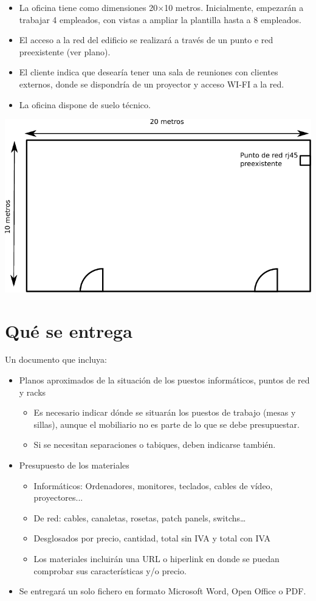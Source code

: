 \begin{itemize}
\item La oficina tiene como dimensiones 20$\times$10  metros. Inicialmente, empezarán a trabajar 4 empleados, con vistas a  ampliar la plantilla hasta a 8 empleados.
\item El acceso a la red del edificio se realizará a través de un punto e red preexistente (ver plano).
\item El cliente indica que desearía tener una sala de reuniones con clientes externos, donde se dispondría de un proyector y acceso WI-FI a la red.
\item La oficina dispone de suelo técnico.
\end{itemize}
\begin{center}
  \includegraphics{media/plano-oficina.pdf}
\end{center}

\section{Qué se entrega}
Un documento que incluya:
\begin{itemize}
\item Planos aproximados de la situación de los puestos informáticos, puntos de red y racks
  \begin{itemize}
  \item Es necesario indicar dónde se situarán los puestos de trabajo (mesas y sillas), aunque el mobiliario no es
    parte de lo que se debe presupuestar.
  \item Si se necesitan separaciones o tabiques, deben indicarse también.
\end{itemize}
\item Presupuesto de los materiales
  \begin{itemize}
  \item Informáticos: Ordenadores, monitores, teclados, cables de vídeo, proyectores...
  \item De red: cables, canaletas, rosetas, patch panels, switchs…
  \item Desglosados por precio, cantidad, total sin IVA y total con IVA
  \item Los materiales incluirán una URL o hiperlink en donde se puedan comprobar sus características y/o precio.
\end{itemize}
\item Se entregará un solo fichero en formato Microsoft Word, Open Office o PDF.
\end{itemize}

